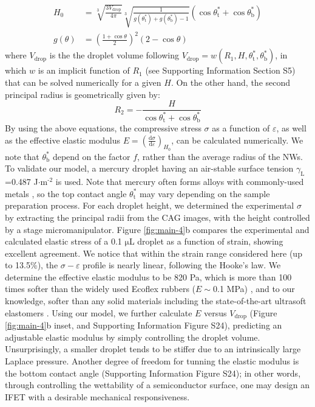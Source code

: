   \begin{equation}
  \label{eq:H0}
  \begin{aligned}
    H_{0} &= \sqrt[3]{\frac{3 V_{\mathrm{drop}}}{4 \pi}} \sqrt[3]{\frac{1}{ 
   g(\theta_{\mathrm{t}}^{*}) + g(\theta_{\mathrm{b}}^{*}) -1 }}  \left(\cos \theta_{\mathrm{t}}^{*} + \cos \theta_{\mathrm{b}}^{*
}\right) \\
    g(\theta) &= \left(\frac{1 + \cos \theta}{2} \right)^{2} \left(2 - \cos \theta \right)
  \end{aligned}
  \end{equation}
where \(V_{\mathrm{drop}}\) is the the droplet volume following
\(V_{\mathrm{drop}} = w(R_{1}, H, \theta_{\mathrm{t}}^{*},
  \theta_{\mathrm{b}}^{*})\), in which \(w\) is an implicit function of
\(R_{1}\) (see Supporting Information Section S5) that can be solved
numerically for a given \(H\). On the other hand, the second principal
radius is geometrically given by:
\begin{equation}
\label{eq:1}
R_{2} = -\frac{H}{\cos \theta_{\mathrm{t}}^{*} + \cos \theta_{\mathrm{b}}^{*}}
\end{equation}
By using the above equations, the compressive stress \(\sigma\) as a
function of \(\varepsilon\), as well as the effective elastic modulus
\(E = \left({\displaystyle \frac{\mathrm{d} \sigma}{\mathrm{d}
  \varepsilon}}\right)_{H_{0}}\), can be calculated numerically. We
note that \(\theta^{*}_{\mathrm{b}}\) depend on the factor \(f\), rather
than the average radius of the NWs.  To validate our model, a
mercury droplet having an air-stable surface tension
\(\gamma_{\mathrm{L}}\)=0.487 J\(\cdot\)m\(^{\text{-2}}\) is used. Note that
mercury often forms alloys with commonly-used metals
\cite{Kieffer_1959}, so the top contact angle
\(\theta_{\mathrm{t}}^{*}\) may vary depending on the sample
preparation process. For each droplet height, we determined the
experimental \(\sigma\) by extracting the principal radii from the CAG
images, with the height controlled by a stage
micromanipulator. Figure \ref{fig:main-4}b compares the experimental
and calculated elastic stress of a 0.1 \(\mathrm{\mu}\)L droplet as
a function of strain, showing excellent agreement. We notice that
within the strain range considered here (up to 13.5\%), the \(\sigma -
  \varepsilon\) profile is nearly linear, following the Hooke's law. We
determine the effective elastic modulus to be 820 Pa, which is more
than 100 times softer than the widely used Ecoflex rubbers
(\(E\sim{}\)0.1 MPa) \cite{Mosadegh_2014}, and to our knowledge, softer than any solid
materials including the state-of-the-art ultrasoft elastomers
\cite{Miriyev_2017,Jang_2015}. Using our model, we further calculate
\(E\) versus \(V_{\mathrm{drop}}\) (Figure \ref{fig:main-4}b inset,
and Supporting Information Figure S24), predicting an adjustable elastic modulus
by simply controlling the droplet volume. Unsurprisingly, a smaller
droplet tends to be stiffer due to an intrinsically large Laplace
pressure. Another degree of freedom for tunning the elastic modulus
is the bottom contact angle (Supporting Information Figure S24); in other
words, through controlling the wettability of a semiconductor
surface, one may design an IFET with a desirable mechanical
responsiveness.

